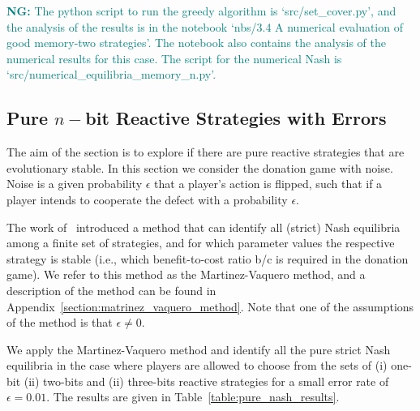 \documentclass{article}
\theoremstyle{definition}
\newcommand{\nikoleta}[1]{\textcolor{teal}{{\bf NG:} #1}}
\begin{document}
\nikoleta{The python script to run the greedy algorithm is `src/set\_cover.py',
and the analysis of the results is in the
notebook `nbs/3.4 A numerical evaluation of good memory-two strategies'.
The notebook also contains the analysis of the numerical results for this case.
The script for the numerical Nash is `src/numerical\_equilibria\_memory\_n.py'.}

\subsection{Pure \(n-\)bit Reactive Strategies with Errors}\label{section:pure_strategies}

The aim of the section is to explore if there are pure reactive strategies that
are evolutionary stable. In this section we consider the donation game with
noise. Noise is a given probability \(\epsilon\) that a player's action is
flipped, such that if a player intends to cooperate the defect with a
probability \(\epsilon\).

The work of~\citep{hilbe:PNAS:2017} introduced a method that can identify all
(strict) Nash equilibria among a finite set of strategies, and for which
parameter values the respective strategy is stable (i.e., which benefit-to-cost
ratio b/c is required in the donation game). We refer to this method as the
Martinez-Vaquero method, and a description of the method can be found in
Appendix~\ref{section:matrinez_vaquero_method}. Note that one of the assumptions
of the method is that \(\epsilon \neq 0\).

We apply the Martinez-Vaquero method and identify all the pure strict Nash
equilibria in the case where players are allowed to choose from the sets of (i)
one-bit (ii) two-bits and (ii) three-bits reactive strategies for a small error
rate of \(\epsilon=0.01\). The results are given in
Table~\ref{table:pure_nash_results}.
\end{document}

